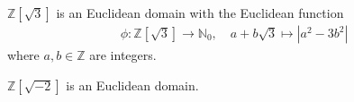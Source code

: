 \begin{exmbox}
    \begin{example}
        \(\mathbb{Z}[\sqrt{3}]\) is an Euclidean domain with the Euclidean function
        \begin{align*}
            \phi: \mathbb{Z}[\sqrt{3}] \longrightarrow \mathbb{N}_0, \quad a + b \sqrt{3} \mapsto |a^2 - 3 b^2|
        \end{align*}
        where \(a, b \in \mathbb{Z}\) are integers.
    \end{example}
\end{exmbox}

\begin{exmbox}
    \begin{example}
        \(\mathbb{Z}[\sqrt{-2}]\) is an Euclidean domain.
    \end{example}
\end{exmbox}

